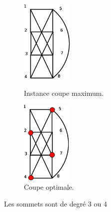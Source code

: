 \begin{figure}[ht]
\begin{minipage}[b]{0.5\linewidth}
\centering
\centering
\includegraphics[height = 4cm]{../images/exo4.eps}
\caption{Instance coupe maximum.}
\label{coupe_max_instance}
\end{minipage}
\hspace{0.5cm}
\begin{minipage}[b]{0.5\linewidth}
\centering
\includegraphics[height = 4cm]{../images/exo4_opt.eps}
\caption{Coupe optimale.}
\label{coupe_max_opt}
\end{minipage}
\end{figure}

\begin{figure}[h!]

\end{figure}

Les sommets sont de degré 3 ou 4
